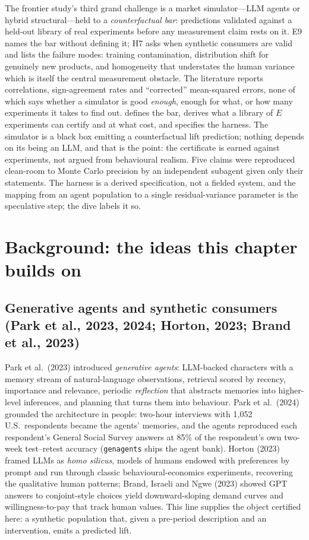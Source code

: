 The frontier study's third grand challenge is a market simulator---LLM agents or hybrid structural---held to a \emph{counterfactual bar}: predictions validated against a held-out library of real experiments before any measurement claim rests on it. E9 names the bar without defining it; H7 asks when synthetic consumers are valid and lists the failure modes: training contamination, distribution shift for genuinely new products, and homogeneity that understates the human variance which is itself the central measurement obstacle. The literature reports correlations, sign-agreement rates and ``corrected'' mean-squared errors, none of which says whether a simulator is good \emph{enough}, enough for what, or how many experiments it takes to find out.  defines the bar, derives what a library of $E$ experiments can certify and at what cost, and specifies the harness. The simulator is a black box emitting a counterfactual lift prediction; nothing depends on its being an LLM, and that is the point: the certificate is earned against experiments, not argued from behavioural realism. Five claims were reproduced clean-room to Monte Carlo precision by an independent subagent given only their statements. The harness is a derived specification, not a fielded system, and the mapping from an agent population to a single residual-variance parameter is the speculative step; the dive labels it so.

\section{Background: the ideas this chapter builds on}

\subsection{Generative agents and synthetic consumers (Park et al., 2023, 2024; Horton, 2023; Brand et al., 2023)}

Park et al.\ (2023) introduced \emph{generative agents}: LLM-backed characters with a memory stream of natural-language observations, retrieval scored by recency, importance and relevance, periodic \emph{reflection} that abstracts memories into higher-level inferences, and planning that turns them into behaviour. Park et al.\ (2024) grounded the architecture in people: two-hour interviews with 1,052 U.S.\ respondents became the agents' memories, and the agents reproduced each respondent's General Social Survey answers at 85\% of the respondent's own two-week test--retest accuracy (\texttt{genagents} ships the agent bank). Horton (2023) framed LLMs as \emph{homo silicus}, models of humans endowed with preferences by prompt and run through classic behavioural-economics experiments, recovering the qualitative human patterns; Brand, Israeli and Ngwe (2023) showed GPT answers to conjoint-style choices yield downward-sloping demand curves and willingness-to-pay that track human values. This line supplies the object certified here: a synthetic population that, given a pre-period description and an intervention, emits a predicted lift.

